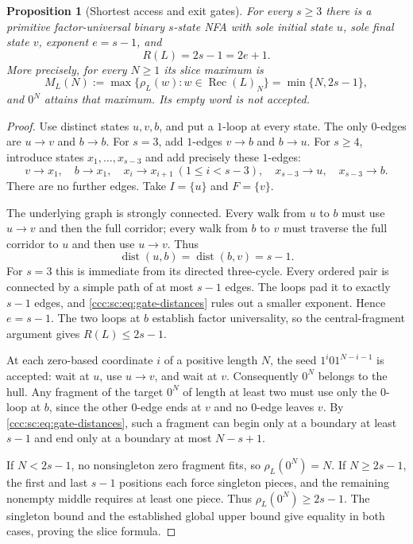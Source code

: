 \documentclass[11pt,letterpaper]{article}
\newtheorem{proposition}[theorem]{Proposition}
\theoremstyle{definition}
\theoremstyle{remark}
\newcommand{\rec}{\operatorname{Rec}}
\newcommand{\rank}{\rho}
\begin{document}
\begin{proposition}[Shortest access and exit gates]\label{ccc:sc:prop:linear}
For every $s\ge3$ there is a primitive factor-universal binary $s$-state NFA with sole initial state $u$, sole final state $v$, exponent $e=s-1$, and
\[
 R(L)=2s-1=2e+1.
\]
More precisely, for every $N\ge1$ its slice maximum is
\[
 M_L(N):=\max\{\rank_L(w):w\in\rec(L)_N\}
       =\min\{N,2s-1\},
\]
and $0^N$ attains that maximum. Its empty word is not accepted.
\end{proposition}
\begin{proof}
Use distinct states $u,v,b$, and put a $1$-loop at every state. The only $0$-edges are $u\to v$ and $b\to b$. For $s=3$, add $1$-edges $v\to b$ and $b\to u$. For $s\ge4$, introduce states $x_1,\ldots,x_{s-3}$ and add precisely these $1$-edges:
\[
 v\to x_1,\quad b\to x_1,\quad
 x_i\to x_{i+1}\ (1\le i<s-3),\quad
 x_{s-3}\to u,\quad x_{s-3}\to b.
\]
There are no further edges. Take $I=\{u\}$ and $F=\{v\}$.

The underlying graph is strongly connected. Every walk from $u$ to $b$ must use $u\to v$ and then the full corridor; every walk from $b$ to $v$ must traverse the full corridor to $u$ and then use $u\to v$. Thus
\begin{equation}\label{ccc:sc:eq:gate-distances}
 \operatorname{dist}(u,b)=\operatorname{dist}(b,v)=s-1.
\end{equation}
For $s=3$ this is immediate from its directed three-cycle. Every ordered pair is connected by a simple path of at most $s-1$ edges. The loops pad it to exactly $s-1$ edges, and \eqref{ccc:sc:eq:gate-distances} rules out a smaller exponent. Hence $e=s-1$. The two loops at $b$ establish factor universality, so the central-fragment argument gives $R(L)\le2s-1$.

At each zero-based coordinate $i$ of a positive length $N$, the seed $1^i01^{N-i-1}$ is accepted: wait at $u$, use $u\to v$, and wait at $v$. Consequently $0^N$ belongs to the hull. Any fragment of the target $0^N$ of length at least two must use only the $0$-loop at $b$, since the other $0$-edge ends at $v$ and no $0$-edge leaves $v$. By \eqref{ccc:sc:eq:gate-distances}, such a fragment can begin only at a boundary at least $s-1$ and end only at a boundary at most $N-s+1$.

If $N<2s-1$, no nonsingleton zero fragment fits, so $\rank_L(0^N)=N$. If $N\ge2s-1$, the first and last $s-1$ positions each force singleton pieces, and the remaining nonempty middle requires at least one piece. Thus $\rank_L(0^N)\ge2s-1$. The singleton bound and the established global upper bound give equality in both cases, proving the slice formula.
\end{proof}
\end{document}
